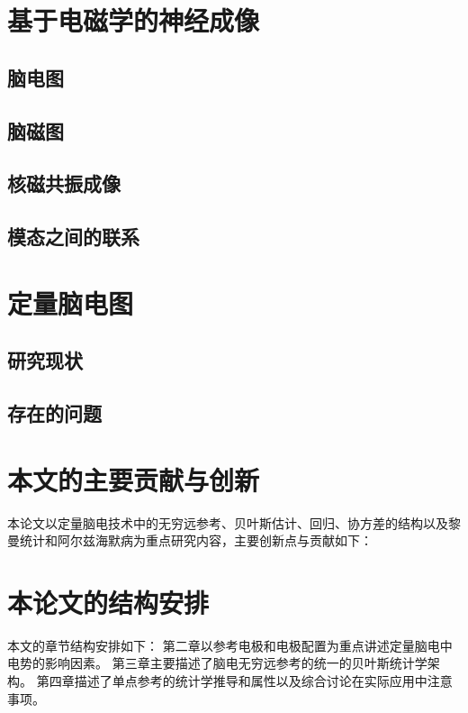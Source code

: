 \thesischapterexordium

\section{基于电磁学的神经成像}
\subsection{脑电图}
\subsection{脑磁图}
\subsection{核磁共振成像}
\subsection{模态之间的联系}

\section{定量脑电图}
\subsection{研究现状}
\subsection{存在的问题}

\section{本文的主要贡献与创新}
本论文以定量脑电技术中的无穷远参考、贝叶斯估计、回归、协方差的结构以及黎曼统计和阿尔兹海默病为重点研究内容，主要创新点与贡献如下：

\section{本论文的结构安排}
本文的章节结构安排如下：
第二章以参考电极和电极配置为重点讲述定量脑电中电势的影响因素。
第三章主要描述了脑电无穷远参考的统一的贝叶斯统计学架构。
第四章描述了单点参考的统计学推导和属性以及综合讨论在实际应用中注意事项。